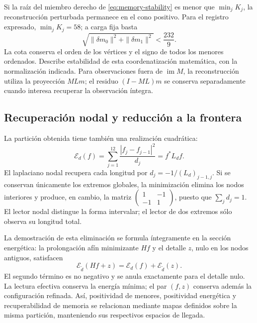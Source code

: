 Si la raíz del miembro derecho de \eqref{eq:memory-stability} es menor que
\(\min_j K_j\), la reconstrucción perturbada permanece en el cono positivo.
Para el registro expresado, \(\min_jK_j=58\); a carga fija basta
\[
 \sqrt{\|\delta m_0\|^2+\|\delta m_1\|^2}<\frac{232}{9}.
\]
La cota conserva el orden de los vértices y el signo de todos los menores
ordenados. Describe estabilidad de esta coordenatización matemática, con la
normalización indicada. Para observaciones fuera de \(\operatorname{im}M\),
la reconstrucción utiliza la proyección \(MLm\); el residuo
\((I-ML)m\) se conserva separadamente cuando interesa recuperar la
observación íntegra.

\subsection{Recuperación nodal y reducción a la frontera}

La partición obtenida tiene también una realización cuadrática:
\[
 \mathcal E_d(f)=\sum_{j=1}^{12}\frac{|f_j-f_{j-1}|^2}{d_j}
 =f^*L_df.
\]
El laplaciano nodal recupera cada longitud por
\(d_j=-1/(L_d)_{j-1,j}\). Si se conservan únicamente los extremos
globales, la minimización elimina los nodos interiores y produce, en
cambio, la matriz \(\left(\begin{smallmatrix}1&-1\\-1&1\end{smallmatrix}\right)\),
puesto que \(\sum_jd_j=1\). El lector nodal distingue la forma intervalar;
el lector de dos extremos sólo observa su longitud total.

La demostración de esta eliminación se formula íntegramente en la sección
energética: la prolongación afín minimizante \(Hf\) y el detalle \(z\),
nulo en los nodos antiguos, satisfacen
\[
 \mathcal E_{\widetilde d}(Hf+z)
 =\mathcal E_d(f)+\mathcal E_{\widetilde d}(z).
\]
El segundo término es no negativo y se anula exactamente para el detalle
nulo. La lectura efectiva conserva la energía mínima; el par \((f,z)\)
conserva además la configuración refinada. Así, positividad de menores,
positividad energética y recuperabilidad de memoria se relacionan mediante
mapas definidos sobre la misma partición, manteniendo sus respectivos
espacios de llegada.
